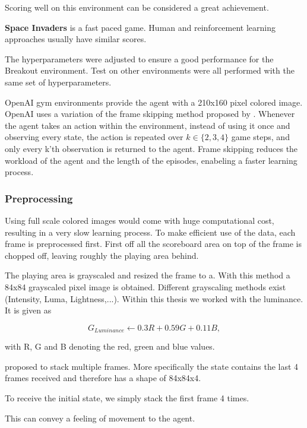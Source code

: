Scoring well on this environment can be considered a great achievement.

\textbf{Space Invaders} is a fast paced game. Human and reinforcement learning approaches usually have similar scores. \citep{mnih2015atari}

The hyperparameters were adjusted to ensure a good performance for the Breakout environment. Test on other environments were all performed with the same set of hyperparameters.


OpenAI gym environments provide the agent with a 210x160 pixel colored image. OpenAI uses a variation of the frame skipping method proposed by \citet{nature}.
Whenever the agent takes an action within the environment, instead of using it once and observing every state, the action is repeated over $k \in \{2,3,4\}$ game steps, and only every k'th observation is returned to the agent. Frame skipping reduces the workload of the agent and the length of the episodes, enabeling a faster learning process.


\subsubsection{Preprocessing}
Using full scale colored images would come with huge computational cost, resulting in a very slow learning process.
To make efficient use of the data, each frame is preprocessed first.
First off all the scoreboard area on top of the frame is chopped off, leaving roughly the playing area behind.

The playing area is grayscaled and resized the frame to a. With this method a 84x84 grayscaled pixel image is obtained.
Different grayscaling methods exist (Intensity, Luma, Lightness,...). Within this thesis we worked with the luminance. It is given as

\begin{equation}
G_{Luminance} \gets 0.3 R + 0.59 G + 0.11 B,
\end{equation}

with R, G and B denoting the red, green and blue values.

\citet{nature} proposed to stack multiple frames. More specifically the state contains the last 4 frames received and therefore has a shape of 84x84x4.

To receive the initial state, we simply stack the first frame 4 times.

This can convey a feeling of movement to the agent.

